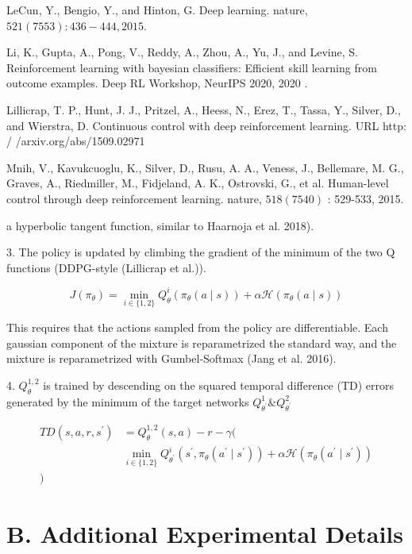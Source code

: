 LeCun, Y., Bengio, Y., and Hinton, G. Deep learning. nature, $521(7553): 436-444,2015$.

Li, K., Gupta, A., Pong, V., Reddy, A., Zhou, A., Yu, J., and Levine, S. Reinforcement learning with bayesian classifiers: Efficient skill learning from outcome examples. Deep RL Workshop, NeurIPS 2020, 2020 .

Lillicrap, T. P., Hunt, J. J., Pritzel, A., Heess, N., Erez, T., Tassa, Y., Silver, D., and Wierstra, D. Continuous control with deep reinforcement learning. URL http: / /arxiv.org/abs/1509.02971

Mnih, V., Kavukcuoglu, K., Silver, D., Rusu, A. A., Veness, J., Bellemare, M. G., Graves, A., Riedmiller, M., Fidjeland, A. K., Ostrovski, G., et al. Human-level control through deep reinforcement learning. nature, $518(7540)$ : 529-533, 2015. 

a hyperbolic tangent function, similar to Haarnoja et al. 2018).

3. The policy is updated by climbing the gradient of the minimum of the two Q functions (DDPG-style (Lillicrap et al.)).

$$
J\left(\pi_{\theta}\right)=\min _{i \in\{1,2\}} Q_{\theta}^{i}\left(\pi_{\theta}(a \mid s)\right)+\alpha \mathcal{H}\left(\pi_{\theta}(a \mid s)\right)
$$

This requires that the actions sampled from the policy are differentiable. Each gaussian component of the mixture is reparametrized the standard way, and the mixture is reparametrized with Gumbel-Softmax (Jang et al. 2016).

4. $Q_{\theta}^{1,2}$ is trained by descending on the squared temporal difference (TD) errors generated by the minimum of the target networks $Q_{\theta^{\prime}}^{1} \& Q_{\theta^{\prime}}^{2}$

$$
\begin{aligned}
T D\left(s, a, r, s^{\prime}\right) &=Q_{\theta}^{1,2}(s, a)-r-\gamma(\\
& \min _{i \in\{1,2\}} Q_{\theta^{\prime}}^{i}\left(s^{\prime}, \pi_{\theta}\left(a^{\prime} \mid s^{\prime}\right)\right)+\alpha \mathcal{H}\left(\pi_{\theta}\left(a^{\prime} \mid s^{\prime}\right)\right) \\
)
\end{aligned}
$$

\section{B. Additional Experimental Details}

